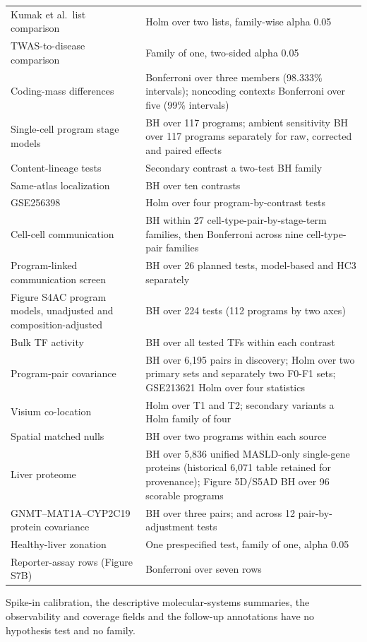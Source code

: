 \begin{longtable}[]{@{}
  >{\raggedright\arraybackslash}p{}
  >{\raggedright\arraybackslash}p{}@{}}
Kumak et al.~list comparison & Holm over two lists, family-wise alpha 0.05 \\
TWAS-to-disease comparison & Family of one, two-sided alpha 0.05 \\
Coding-mass differences & Bonferroni over three members (98.333\% intervals); noncoding contexts Bonferroni over five (99\% intervals) \\
Single-cell program stage models & BH over 117 programs; ambient sensitivity BH over 117 programs separately for raw, corrected and paired effects \\
Content-lineage tests & Secondary contrast a two-test BH family \\
Same-atlas localization & BH over ten contrasts \\
GSE256398 & Holm over four program-by-contrast tests \\
Cell-cell communication & BH within 27 cell-type-pair-by-stage-term families, then Bonferroni across nine cell-type-pair families \\
Program-linked communication screen & BH over 26 planned tests, model-based and HC3 separately \\
Figure S4AC program models, unadjusted and composition-adjusted & BH over 224 tests (112 programs by two axes) \\
Bulk TF activity & BH over all tested TFs within each contrast \\
Program-pair covariance & BH over 6,195 pairs in discovery; Holm over two primary sets and separately two F0-F1 sets; GSE213621 Holm over four statistics \\
Visium co-location & Holm over T1 and T2; secondary variants a Holm family of four \\
Spatial matched nulls & BH over two programs within each source \\
Liver proteome & BH over 5,836 unified MASLD-only single-gene proteins (historical 6,071 table retained for provenance); Figure 5D/S5AD BH over 96 scorable programs \\
GNMT--MAT1A--CYP2C19 protein covariance & BH over three pairs; and across 12 pair-by-adjustment tests \\
Healthy-liver zonation & One prespecified test, family of one, alpha 0.05 \\
Reporter-assay rows (Figure S7B) & Bonferroni over seven rows \\
\end{longtable}

Spike-in calibration, the descriptive molecular-systems summaries, the observability and coverage fields and the follow-up annotations have no hypothesis test and no family.

